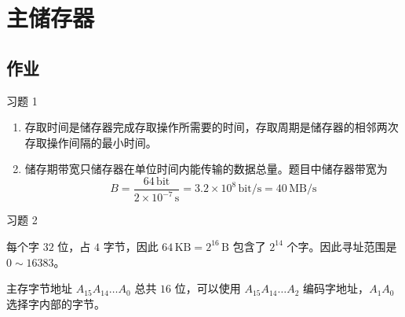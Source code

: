 \section{主储存器}

\subsection{作业}

\begin{problem}
    习题 1
    \begin{solution}
        \begin{enumerate}
            \item[\textbf{1)}] 存取时间是储存器完成存取操作所需要的时间，存取周期是储存器的相邻两次存取操作间隔的最小时间。
            
            \item[\textbf{2)}] 储存期带宽只储存器在单位时间内能传输的数据总量。题目中储存器带宽为
            $$
            B = \frac{64 \,\mathrm{bit}}{2 \times 10^{-7} \,\mathrm{s}} = 3.2 \times 10^{8} \,\mathrm{bit / s} = 40 \,\mathrm{MB / s}
            $$
        \end{enumerate}
    \end{solution}
\end{problem}

\begin{problem}
    习题 2
    \begin{solution}
        每个字 $32$ 位，占 $4$ 字节，因此 $64 \,\mathrm{KB} = 2^{16} \,\mathrm{B}$ 包含了 $2^{14}$ 个字。因此寻址范围是 $0 \sim 16383$。

        主存字节地址 $A_{15} A_{14} \dots A_0$ 总共 $16$ 位，可以使用 $A_{15} A_{14} \dots A_2$ 编码字地址，$A_1 A_0$ 选择字内部的字节。
    \end{solution}
\end{problem}

